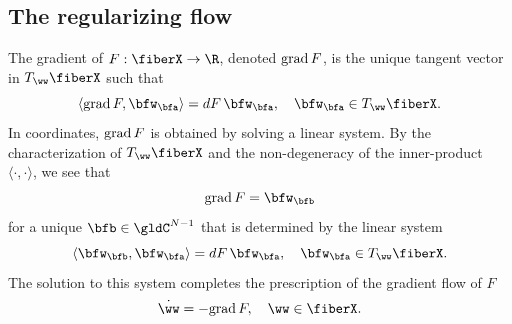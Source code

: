 \subsection{The regularizing flow}
The gradient of $F:\fiberX\to \R$, denoted $\mathrm{grad}\, F$, is the unique tangent vector in $T_\ww \fiberX$ such that  
\begin{equation}
    \label{eq:def-grad}
    \langle \grad F , \bfw_\bfa \rangle = dF \, \bfw_\bfa, \quad \bfw_\bfa \in T_\ww \fiberX.
\end{equation}
In coordinates, $\mathrm{grad}\, F$ is obtained by solving a linear system. By the characterization of $T_\ww \fiberX$ and the non-degeneracy of the inner-product $\langle \cdot, \cdot \rangle$, we see that
\begin{equation}
    \label{eq:def-grad2} \grad F = \bfw_\bfb
\end{equation}
for a unique $\bfb \in \gldC^{N-1}$ that is determined by the linear system
\begin{equation}
    \label{eq:def-grad3} \langle \bfw_\bfb, \bfw_\bfa \rangle = dF \, \bfw_\bfa, \quad \bfw_\bfa \in T_\ww \fiberX.
\end{equation}
The solution to this system completes the prescription of the gradient flow of $F$
\begin{equation}
    \label{eq:def-grad11} \dot\ww = - \grad F, \quad \ww \in \fiberX.
\end{equation}

